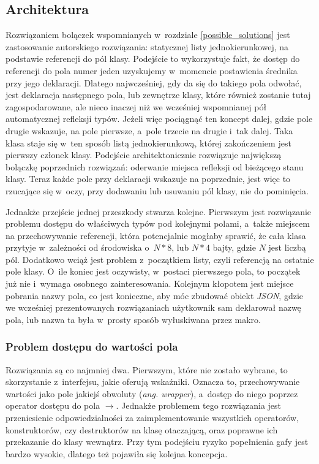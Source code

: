 \documentclass[12pt]{article}
\newcommand{\n}{\newline}
\newcommand{\nonpl}[1]{{\it #1}}
\newcommand{\ang}[1]{\nonpl{ang. #1}}
\newcommand{\JSON}{\nonpl{JSON}}
\begin{document}
{		{
			\subsection{Architektura}

			Rozwiązaniem bolączek wspomnianych w~rozdziale \ref{possible_solutions} jest zastosowanie autorskiego rozwiązania: statycznej listy jednokierunkowej, na podstawie
			referencji do pól klasy. Podejście to wykorzystuje fakt, że dostęp do referencji do pola numer jeden uzyskujemy w~momencie postawienia średnika przy jego deklaracji.
			Dlatego najwcześniej, gdy da się do takiego pola odwołać, jest deklaracja następnego pola, lub zewnętrze klasy, które również zostanie tutaj zagospodarowane,
			ale nieco inaczej niż we wcześniej wspomnianej pół automatycznej refleksji typów. Jeżeli więc pociągnąć ten koncept dalej, gdzie pole drugie wskazuje, na
			pole pierwsze, a~pole trzecie na drugie i~tak dalej. Taka klasa staje się w~ten sposób listą jednokierunkową, której zakończeniem jest pierwszy członek klasy.
			Podejście architektonicznie rozwiązuje największą bolączkę poprzednich rozwiązań: oderwanie miejsca refleksji od bieżącego stanu klasy.
			Teraz każde pole przy deklaracji wskazuje na poprzednie, jest więc to rzucające się w~oczy, przy dodawaniu lub usuwaniu pól klasy, nie do pominięcia.\n

			Jednakże przejście jednej przeszkody stwarza kolejne. Pierwszym jest rozwiązanie problemu dostępu do właściwych typów pod kolejnymi polami, a~także
			miejscem na przechowywanie referencji, która potencjalnie mogłaby sprawić, że cała klasa przytyje w~zależności od środowiska o~$N * 8$, lub $N * 4$ bajty,
			gdzie $N$ jest liczbą pól. Dodatkowo wciąż jest problem z~początkiem listy, czyli referencją na ostatnie pole klasy. O~ile koniec jest oczywisty,
			w~postaci pierwszego pola, to początek już nie i~wymaga osobnego zainteresowania. Kolejnym kłopotem jest miejsce pobrania nazwy pola, co jest
			konieczne, aby móc zbudować obiekt \JSON, gdzie we wcześniej prezentowanych rozwiązaniach użytkownik sam deklarował nazwę pola, lub nazwa ta
			była w~prosty sposób wyłuskiwana przez makro.\n

			{
				\subsubsection{Problem dostępu do wartości pola}

				Rozwiązania są co najmniej dwa. Pierwszym, które nie zostało wybrane, to skorzystanie z~interfejsu, jakie oferują wskaźniki. Oznacza to,
				przechowywanie wartości jako pole jakiejś obwoluty (\ang{wrapper}), a~dostęp do niego poprzez operator dostępu do pola $\rightarrow$. Jednakże problemem
				tego rozwiązania jest przeniesienie odpowiedzialności za zaimplementowanie wszystkich operatorów, konstruktorów, czy destruktorów
				na klasę otaczającą, oraz poprawne ich przekazanie do klasy wewnątrz. Przy tym podejściu ryzyko popełnienia gafy jest bardzo wysokie, dlatego też
				pojawiła się kolejna koncepcja.\n

}}}
\end{document}
